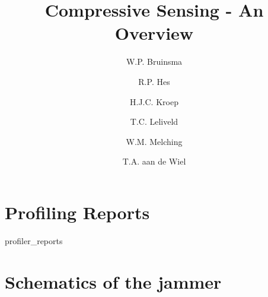 \documentclass[a4paper, openany, oneside]{memoir}
\title{Compressive Sensing - An Overview}
\author{W.P. Bruinsma \and R.P. Hes \and H.J.C. Kroep \and T.C. Leliveld \and W.M. Melching \and T.A. aan de Wiel}
\begin{document}
\appendix

\chapter{Profiling Reports}
\label{ap:prof}
{profiler_reports}

\chapter{Schematics of the jammer}
\label{ap:jammer}

\end{document}
